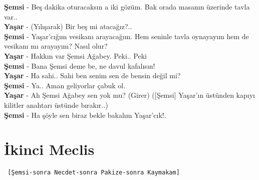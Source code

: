 \documentclass[]{book}
\begin{document}
\textbf{Şemsi} - Beş dakika oturacaksın a iki gözüm. Bak orada masanın üzerinde tavla var..\\
\textbf{Yaşar} - (Yılışarak) Bir beş mi atacağız?..\\
\textbf{Şemsi} - Yaşar'cığım vesikanı arayacağım. Hem seninle tavla oynayayım hem de vesikanı mı arayayım? Nasıl olur?\\
\textbf{Yaşar} - Hakkın var Şemsi Ağabey. Peki.. Peki\\
\textbf{Şemsi} - Bana Şemsi deme be, ne davul kafalısın!\\
\textbf{Yaşar} - Ha sahi.. Sahi ben senim sen de bensin değil mi?\\
\textbf{Şemsi} - Ya.. Aman geliyorlar çabuk ol.\\
\textbf{Yaşar} - Ah Şemsi Ağabey sen yok mu? (Girer) ({[}Şemsi{]} Yaşar'ın üstünden kapıyı kilitler anahtarı üstünde bırakır..)\\
\textbf{Şemsi} - Ha şöyle sen biraz bekle bakalım Yaşar'cık!.\\

\hypertarget{ikinci-meclis-2}{%
\section{İkinci Meclis}\label{ikinci-meclis-2}}

\begin{verbatim}
 [Şemsi-sonra Necdet-sonra Pakize-sonra Kaymakam]
\end{verbatim}
\end{document}
